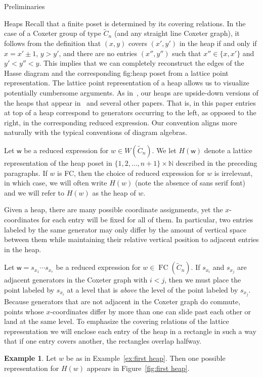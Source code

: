 \documentclass[11pt]{amsart}
\theoremstyle{definition}
\newtheorem{example}[theorem]{Example}
\numberwithin{equation}{section}
\newcommand{\N}{\mathbb{N}}
\newcommand{\C}{\widetilde{C}}
\renewcommand{\(}{\left(}
\renewcommand{\)}{\right)}
\newcommand{\w}{\mathsf{w}}
\DeclareMathOperator{\FC}{FC}
\begin{document}
\begin{section}{Preliminaries}
\begin{subsection}{Heaps}
Recall that a finite poset is determined by its covering relations.  In the case of a Coxeter group of type $\C_{n}$ (and any straight line Coxeter graph), it follows from the definition that $(x,y)$ covers $(x',y')$ in the heap if and only if $x = x' \pm 1$, $y > y'$, and there are no entries $(x'', y'')$ such that $x'' \in \{x, x'\}$ and $y'< y'' < y$.  This implies that we can completely reconstruct the edges of the Hasse diagram and the corresponding fig:heap poset from a lattice point representation. The lattice point representation of a heap allows us to visualize potentially cumbersome arguments.  As in~\cite{Ernst2010}, our heaps are upside-down versions of the heaps that appear in~\cite{Billey2007} and several other papers.  That is, in this paper entries at top of a heap correspond to generators occurring to the left, as opposed to the right, in the corresponding reduced expression.  Our convention aligns more naturally with the typical conventions of diagram algebras.

Let $\w$ be a reduced expression for $w \in W(\C_{n})$.  We let $H(\w)$ denote a lattice representation of the heap poset in $\{1,2,\ldots,n+1\} \times \N$ described in the preceding paragraphs.  If $w$ is FC, then the choice of reduced expression for $w$ is irrelevant, in which case, we will often write $H(w)$ (note the absence of \textsf{sans serif} font) and we will refer to $H(w)$ as the heap of $w$.

Given a heap, there are many possible coordinate assignments, yet the $x$-coordinates for each entry will be fixed for all of them.  In particular, two entries labeled by the same generator may only differ by the amount of vertical space between them while maintaining their relative vertical position to adjacent entries in the heap.

Let $\w=s_{x_1}\cdots s_{x_r}$ be a reduced expression for $w \in \FC(\C_{n})$.  If $s_{x_i}$ and $s_{x_j}$ are adjacent generators in the Coxeter graph with $i<j$, then we must place the point labeled by $s_{x_i}$ at a level that is \emph{above} the level of the point labeled by $s_{x_j}$.  Because generators that are not adjacent in the Coxeter graph do commute, points whose $x$-coordinates differ by more than one can slide past each other or land at the same level.  To emphasize the covering relations of the lattice representation we will enclose each entry of the heap in a rectangle in such a way that if one entry covers another, the rectangles overlap halfway.

\begin{example}\label{ex:second heap}
Let $w$ be as in Example~\ref{ex:first heap}.  Then one possible representation for $H(w)$ appears in Figure~\ref{fig:first heap}.
\end{example}


\end{subsection}
\end{section}
\end{document}
